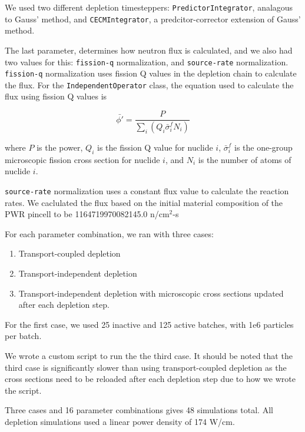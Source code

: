     We used two different depletion timesteppers: \verb.PredictorIntegrator.,
    analagous to Gauss' method, and \verb.CECMIntegrator., a predcitor-corrector
    extension of Gauss' method.

    The last parameter, determines how neutron flux is calculated, and we also
    had two values for this: \verb.fission-q. normalization, and
    \verb.source-rate. normalization. \verb.fission-q. normalization uses
    fission Q  values in the depletion chain to calculate the flux. For the
    \verb.IndependentOperator. class, the equation used to calculate the flux
    using fission Q values is

    \begin{equation}
        \bar{\phi'} = \frac{P}{\sum\limits_i (Q_i \bar{\sigma}^f_i N_i)}
    \end{equation}

    where $P$ is the power, $Q_i$ is the fission Q value for nuclide $i$,
    $\bar{\sigma}_i^f$ is the one-group microscopic fission cross section for
    nuclide $i$, and $N_i$ is the number of atoms of nuclide $i$.

    \verb.source-rate. normalization uses a constant flux value to calculate the
    reaction rates. We caclulated the flux based on the initial material
    composition of the PWR pincell to be 1164719970082145.0 n/cm$^2$-s

    For each parameter combination, we ran with three cases:
    \begin{enumerate}
        \item Transport-coupled depletion
        \item Transport-independent depletion
        \item Transport-independent depletion with microscopic cross sections
            updated after each depletion step.
    \end{enumerate}

    For the first case, we used 25 inactive and 125 active batches, with 1e6
    particles per batch.

    We wrote a custom script to run the the third case. It should be noted that
    the third case is significantly slower than using transport-coupled depletion
    as the cross sections need to be reloaded after each depletion step due to how
    we wrote the script.

    Three cases and 16 parameter combinations gives 48 simulations total. All
    depletion simulations used a linear power density of 174 W/cm.

